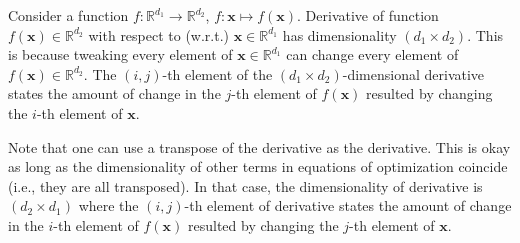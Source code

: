 \documentclass[lang=cn,10pt]{gorgeousnbook}
\numberwithin{equation}{section}%
\numberwithin{figure}{section}%
\begin{document}
\begin{remark}\label{remark_dimensionality_of_derivative}
Consider a function $f: \mathbb{R}^{d_1} \rightarrow \mathbb{R}^{d_2}$, $f: \boldsymbol{x} \mapsto f(\boldsymbol{x})$.
Derivative of function $f(\boldsymbol{x}) \in \mathbb{R}^{d_2}$ with respect to (w.r.t.) $\boldsymbol{x} \in \mathbb{R}^{d_1}$ has dimensionality $(d_1 \times d_2)$. This is because tweaking every element of $\boldsymbol{x} \in \mathbb{R}^{d_1}$ can change every element of $f(\boldsymbol{x}) \in \mathbb{R}^{d_2}$. The $(i,j)$-th element of the $(d_1 \times d_2)$-dimensional derivative states the amount of change in the $j$-th element of $f(\boldsymbol{x})$ resulted by changing the $i$-th element of $\boldsymbol{x}$. 

Note that one can use a transpose of the derivative as the derivative. This is okay as long as the dimensionality of other terms in equations of optimization coincide (i.e., they are all transposed). In that case, the dimensionality of derivative is $(d_2 \times d_1)$ where the $(i,j)$-th element of derivative states the amount of change in the $i$-th element of $f(\boldsymbol{x})$ resulted by changing the $j$-th element of $\boldsymbol{x}$. 


\end{remark}
\end{document}
